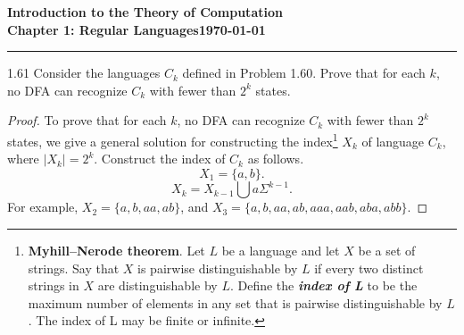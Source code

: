 \documentclass[11pt]{article}
\newcommand{\dated}{\today}
\begin{document}
\textbf{Introduction to the Theory of
Computation}\hfill\textbf{\myname}\\[0.01in]
\textbf{Chapter 1: Regular Languages}\hfill\textbf{\dated}\\
\smallskip\hrule\bigskip

\begin{problem}{1.61}
Consider the languages $C_k$ defined in Problem 1.60. Prove that for each $k$, no DFA
can recognize $C_k$ with fewer than $2^k$ states.
\end{problem}

\begin{proof}
To prove that for each $k$, no DFA can recognize $C_k$ with fewer than $2^k$ states, we give a general solution for constructing the index\footnote{\textbf{Myhill–Nerode theorem}. Let $L$ be a language and let $X$ be a set of strings. Say that $X$ is pairwise distinguishable by $L$ if every two distinct strings in $X$ are distinguishable by $L$. Define the \textbf{\textit{index of L}} to be the maximum number of elements in any set that is pairwise distinguishable by $L$. The index of L may be finite or infinite.} $X_k$ of language $C_k$, where $|X_k| = 2^k$. Construct the index of $C_k$ as follows.
\[
X_1 = \{a,b\}.
\]
\[
X_k = X_{k-1} \bigcup a\Sigma^{k-1}.
\]
For example, $X_2 = \{a,b,aa,ab\}$, and $X_3 = \{a,b,aa,ab,aaa,aab,aba,abb\}$.


\end{proof}
\end{document}

